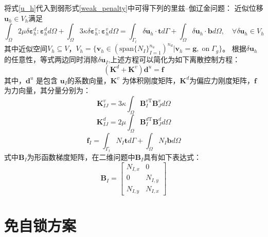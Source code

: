 将式\eqref{u_h}代入到弱形式\eqref{weak_penalty}中可得下列的里兹--伽辽金问题：
近似位移 $\boldsymbol u_h \in V_h$满足
\begin{equation}\label{ritz_penalty}
\int_\Omega 2\mu \delta \boldsymbol \varepsilon^d_h : \boldsymbol \varepsilon^d_h d\Omega +
\int_\Omega 3\kappa \delta \boldsymbol \varepsilon^v_h : \boldsymbol \varepsilon^v_h d\Omega =
\int_{\Gamma_t} \delta \boldsymbol u_h \cdot \boldsymbol t d\Gamma + \int_\Omega \delta \boldsymbol u_h \cdot \boldsymbol b d\Omega, \quad
\forall \delta \boldsymbol u_h \in V_h
\end{equation}
其中近似空间$V_h \subseteq V$，$V_h = \{\boldsymbol v_h \in (\mathrm{span}\{N_I\}_{I=1}^{n_u})^{n_d} \vert \boldsymbol v_h = \boldsymbol g,\; \mathrm{on} \; \Gamma_g\}$。
根据$\delta \boldsymbol u_h$的任意性，等式两边同时消除$\delta \boldsymbol u_I$,上述方程可以简化为如下离散控制方程：
\begin{equation}\label{equilibrium_penalty}
    (\boldsymbol K^d +\boldsymbol K^v) \boldsymbol d^u = \boldsymbol f
\end{equation}
其中，$\boldsymbol d^u$ 是包含 $\boldsymbol u_I$的系数向量，$\boldsymbol K^v$ 为体积刚度矩阵，$\boldsymbol K^d$为偏应力刚度矩阵，$\boldsymbol f$为力向量，其分量分别为：
\begin{equation}\label{stiffness_vol}
    \boldsymbol K^v_{IJ}=  3\kappa\int_{\Omega} \boldsymbol B^{v\mathrm T}_I \boldsymbol B^v_J d\Omega
\end{equation}
\begin{equation}\label{stiffness_dev}
    \boldsymbol K^d_{IJ}= 2\mu\int_{\Omega} \boldsymbol B^{d\mathrm T}_I \boldsymbol B^d_J d\Omega
\end{equation}
\begin{equation}
    \boldsymbol f_I = \int_{\Gamma_t} N_I \boldsymbol t d\Gamma + \int_{\Omega} N_I \boldsymbol b d\Omega
\end{equation}
式中$\boldsymbol B_I$为形函数梯度矩阵，在二维问题中$\boldsymbol B_I$具有如下表达式：
\begin{equation}\label{strain vector}
    \pmb{B}_I= \left[\begin{matrix}N_{I,x}&0\\0&N_{I,y}\\N_{I,y}&N_{I,x} \end{matrix}\right] 
\end{equation}
\section{免自锁方案}
